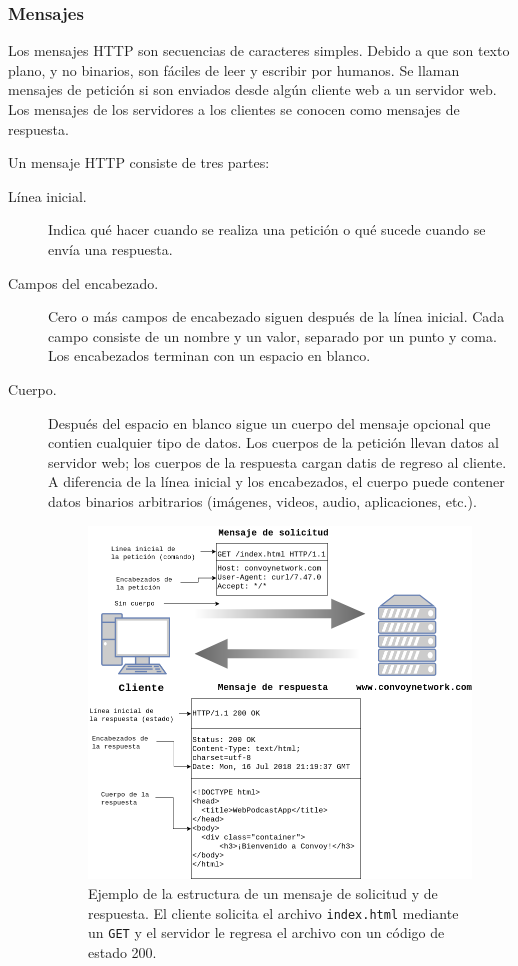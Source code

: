 \subsubsection{Mensajes}
\label{\detokenize{chapter_one/rest:mensajes}}
Los mensajes HTTP son secuencias de caracteres simples. Debido a que son
texto plano, y no binarios, son fáciles de leer y escribir por humanos.
Se llaman mensajes de petición si son enviados desde algún cliente web a
un servidor web. Los mensajes de los servidores a los clientes se
conocen como mensajes de respuesta.

Un mensaje HTTP consiste de tres partes:
\begin{description}
\item[{Línea inicial.}] \leavevmode
Indica qué hacer cuando se realiza una petición o qué sucede cuando
se envía una respuesta.

\item[{Campos del encabezado.}] \leavevmode
Cero o más campos de encabezado siguen después de la línea inicial.
Cada campo consiste de un nombre y un valor, separado por un punto y
coma. Los encabezados terminan con un espacio en blanco.

\item[{Cuerpo.}] \leavevmode
Después del espacio en blanco sigue un cuerpo del mensaje opcional
que contien cualquier tipo de datos. Los cuerpos de la petición
llevan datos al servidor web; los cuerpos de la respuesta cargan
datis de regreso al cliente. A diferencia de la línea inicial y los
encabezados, el cuerpo puede contener datos binarios arbitrarios
(imágenes, videos, audio, aplicaciones, etc.).

\begin{figure}
    \centering
    \includegraphics[scale=0.5]{figures/http_message.png}
    \caption{Ejemplo de la estructura de un mensaje de solicitud y de respuesta. El cliente solicita el archivo \texttt{index.html} mediante
    un \texttt{GET} y el servidor le regresa el archivo con un código de estado
    200.}
    \label{http-message}
\end{figure}


\end{description}
